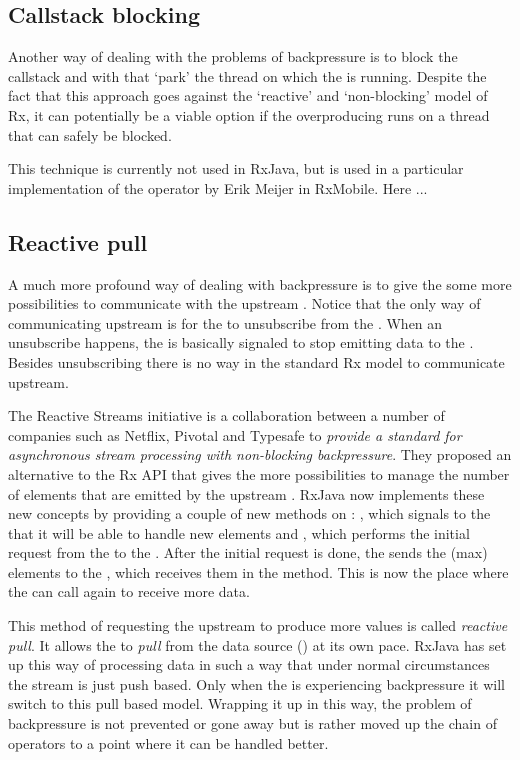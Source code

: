 \subsection{Callstack blocking}
Another way of dealing with the problems of backpressure is to block the callstack and with that `park' the thread on which the \obs is running. Despite the fact that this approach goes against the `reactive' and `non-blocking' model of Rx, it can potentially be a viable option if the overproducing \obs runs on a thread that can safely be blocked.

This technique is currently not used in RxJava, but is used in a particular implementation of the  operator by Erik Meijer in RxMobile. Here ... 

\subsection{Reactive pull}
A much more profound way of dealing with backpressure is to give the \obv some more possibilities to communicate with the upstream \obs. Notice that the only way of communicating upstream is for the \obv to unsubscribe from the \obs. When an unsubscribe happens, the \obs is basically signaled to stop emitting data to the \obv. Besides unsubscribing there is no way in the standard Rx model to communicate upstream.

The Reactive Streams initiative  is a collaboration between a number of companies such as Netflix, Pivotal and Typesafe to \textit{provide a standard for asynchronous stream processing with non-blocking backpressure}. They proposed an alternative to the Rx API that gives the \obv more possibilities to manage the number of elements that are emitted by the upstream \obs. RxJava now implements these new concepts by providing a couple of new methods on \obv: , which signals to the \obs that it will be able to handle  new elements and , which performs the initial request from the \obv to the \obs. After the initial request is done, the \obs sends the (max)  elements to the \obv, which receives them in the  method. This is now the place where the \obv can call  again to receive more data.

This method of requesting the upstream to produce more values is called \textit{reactive pull}. It allows the \obv to \emph{pull} from the data source (\obs) at its own pace. RxJava has set up this way of processing data in such a way that under normal circumstances the stream is just push based. Only when the \obv is experiencing backpressure it will switch to this pull based model. Wrapping it up in this way, the problem of backpressure is not prevented or gone away but is rather moved up the chain of operators to a point where it can be handled better. 

